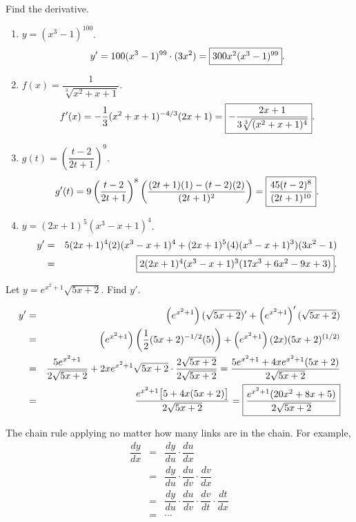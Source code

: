 \documentclass{book}
\begin{document}
\begin{Exam} Find the derivative.
\begin{enumerate}
\item $y = (x^3-1)^{100}$.
\[y' = 100(x^3-1)^{99}\cdot (3x^2) = \fbox{$300x^2(x^3-1)^{99}$}.\]

\item $f(x) = \dfrac{1}{\sqrt[3]{x^2+x+1}}$.
\[f'(x) = -\dfrac{1}{3}(x^2+x+1)^{-4/3}(2x+1) = \fbox{$-\dfrac{2x+1}{3\sqrt[3]{(x^2+x+1)^4}}$}.\]

\item $g(t) = \left(\dfrac{t-2}{2t+1}\right)^9$. 
\[g'(t) = 9\left(\dfrac{t-2}{2t+1}\right)^8\left(\dfrac{(2t+1)(1) - (t-2)(2)}{(2t+1)^2}\right) = \fbox{$\dfrac{45(t-2)^8}{(2t+1)^{10}}$}.\]

\item $y = (2x+1)^5(x^3-x+1)^4$.
\begin{eqnarray*}
y' &=& 5(2x+1)^4(2)(x^3-x+1)^4 + (2x+1)^5(4)(x^3-x+1)^3)(3x^2-1) \\
&=& \fbox{$2(2x+1)^4(x^3-x+1)^3(17x^3+6x^2-9x+3)$}.
\end{eqnarray*}
\end{enumerate}
\end{Exam}\vs

\begin{Exam} Let $y = e^{x^2+1}\sqrt{5x+2}$. Find $y'$.

\begin{eqnarray*}
y' &=& \left(e^{x^2+1}\right)(\sqrt{5x+2})' + \left(e^{x^2+1}\right)'(\sqrt{5x+2})\\ & =& \left(e^{x^2+1}\right)\left(\frac{1}{2}(5x+2)^{-1/2}(5)\right) + \left(e^{x^2+1}\right)(2x)(5x+2)^{(1/2)}\\
&=& \dfrac{5e^{x^2+1}}{2\sqrt{5x+2}} + 2xe^{x^2+1}\sqrt{5x+2}\cdot\dfrac{2\sqrt{5x+2}}{2\sqrt{5x+2}} = \dfrac{5e^{x^2+1} + 4xe^{x^2+1}(5x+2)}{2\sqrt{5x+2}}\\
&=& \dfrac{e^{x^2+1}\big[5 + 4x(5x+2)\big]}{2\sqrt{5x+2}} = \fbox{$\dfrac{e^{x^2+1}(20x^2+8x+5)}{2\sqrt{5x+2}}$}
\end{eqnarray*}
\end{Exam}\vs

The chain rule applying no matter how many links are in the chain. For example, 
\begin{eqnarray*}
\dfrac{dy}{dx} &=& \dfrac{dy}{du}\cdot\dfrac{du}{dx}\\
 &=& \dfrac{dy}{du}\cdot\dfrac{du}{dv}\cdot\dfrac{dv}{dx}\\
  &=& \dfrac{dy}{du}\cdot\dfrac{du}{dv}\cdot\dfrac{dv}{dt}\cdot\dfrac{dt}{dx}\\
 & =& \cdots
\end{eqnarray*}
\end{document}
